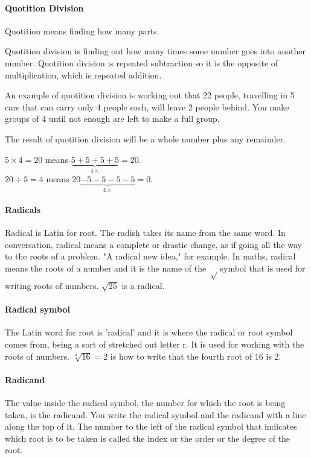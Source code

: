 \documentclass[12pt]{article}
\begin{document}
{\paragraph{Quotition Division}

Quotition means finding how many parts.

Quotition division is finding out how many times some number goes into another number. Quotition division is repeated subtraction so it is the opposite of multiplication, which is repeated addition.

An example of quotition division is working out that 22 people, travelling in 5 cars that can carry only 4 people each, will leave 2 people behind. You make groups of 4 until not enough are left to make a full group.

The result of quotition division will be a whole number plus any remainder.


$5 \times 4 = 20$ means $\underbrace{ 5 + 5 + 5 + 5}_{4 \times} = 20$.\\

$20 \div 5 = 4$ means $20 \underbrace{- 5 - 5 - 5 - 5}_{4 \times} = 0$.\\

\paragraph{Radicals}
Radical is Latin for root. The radish takes its name from the same word. In conversation, radical means a complete or drastic change, as if going all the way to the roots of a problem. "A radical new idea," for example. In maths, radical means the roots of a number and it is the name of the $\sqrt$ symbol that is used for writing roots of numbers. $\sqrt{25}$ is a radical.

\paragraph{Radical symbol}
The Latin word for root is 'radical' and it is where the radical or root symbol \raisebox{.8ex}{$\sqrt{}$} comes from, being a sort of stretched out letter r. It is used for working with the roots of numbers. $\sqrt[4]{16}=2$ is how to write that the fourth root of 16 is 2.

\paragraph{Radicand}
The value inside the radical symbol, the number for which the root is being taken, is the radicand. You write the radical \raisebox{.8ex}{$\sqrt{}$} symbol and the radicand with a line along the top of it. The number to the left of the radical symbol that indicates which root is to be taken is called the index or the order or the degree of the root.

}
\end{document}
